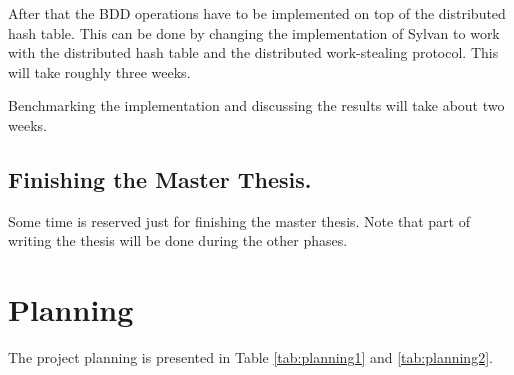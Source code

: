 After that the BDD operations have to be implemented on top of the distributed hash table. This can be done by changing the implementation of Sylvan to work with the distributed hash table and the distributed work-stealing protocol. This will take roughly three weeks.

Benchmarking the implementation and discussing the results will take about two weeks.

\subsection{Finishing the Master Thesis.}
Some time is reserved just for finishing the master thesis. Note that part of writing the thesis will be done during the other phases.

\section{Planning}
The project planning is presented in Table \ref{tab:planning1} and \ref{tab:planning2}.

